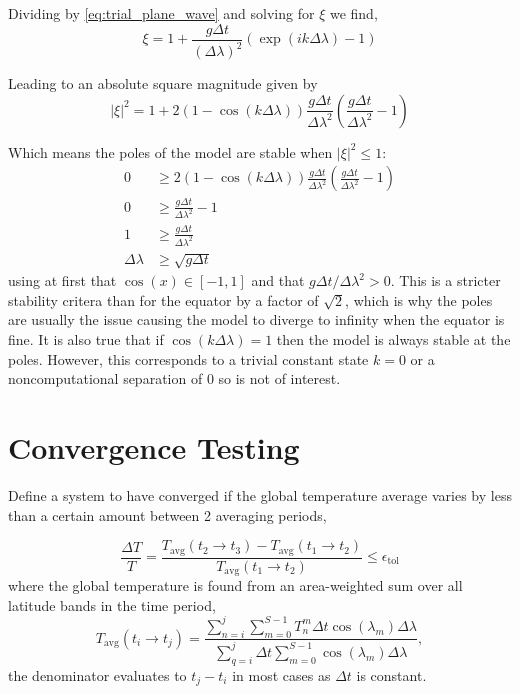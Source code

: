 \documentclass[12pt, onecolumn]{revtex4-2}    %
\begin{document}
Dividing by \eqref{eq:trial_plane_wave} and solving for $\xi$ we find,
\begin{equation}
    \xi = 1 + \frac{g\Delta t}{(\Delta \lambda)^2}\left(\exp(i k \Delta \lambda) - 1\right)
\end{equation}

Leading to an absolute square magnitude given by
\begin{equation}
    |\xi|^2 = 1 + 2 (1-\cos(k\Delta\lambda)) \frac{g \Delta t}{\Delta \lambda ^2}\left(\frac{g\Delta t}{\Delta \lambda ^2} - 1\right)
\end{equation}

Which means the poles of the model are stable when $|\xi|^2 \le 1$:
\begin{align*}
    0              & \ge 2(1-\cos(k\Delta\lambda)) \frac{g \Delta t}{\Delta \lambda ^2}\left(\frac{g\Delta t }{\Delta \lambda ^2} - 1\right) \\
    0              & \ge \frac{g \Delta t}{\Delta \lambda ^2} - 1                                                                            \\
    1              & \ge \frac{g \Delta t}{\Delta \lambda ^2}                                                                                \\
    \Delta \lambda & \ge \sqrt{g \Delta t}
\end{align*}
using at first that $\cos(x) \in [-1, 1]$ and that $g \Delta t / \Delta\lambda^2 > 0$.
This is a stricter stability critera than for the equator by a factor of $\sqrt{2}$, which is why the poles are usually the issue causing the model to diverge to infinity when the equator is fine.
It is also true that if $\cos(k\Delta\lambda) = 1$ then the model is always stable at the poles.
However, this corresponds to a trivial constant state $k = 0$ or a noncomputational separation of $0$ so is not of interest.

\section{Convergence Testing} \label{sec:conv_testing}

Define a system to have converged if the global temperature average varies by less than a certain amount between 2 averaging periods,

\begin{equation*}
    \frac{\Delta T}{T} = \frac{T_{\text{avg}}(t_2 \to t_3) - T_{\text{avg}}(t_1 \to t_2)}{T_{\text{avg}}(t_1 \to t_2)}
    \le \epsilon_{\text{tol}}
\end{equation*}
where the global temperature is found from an area-weighted sum over all latitude bands in the time period,
\begin{equation}
    T_{\text{avg}}(t_i \to t_j) = \frac{\sum_{n = i}^{j} \sum_{m = 0}^{S-1} T^m_n \Delta t \cos(\lambda_m)\Delta \lambda}{\sum_{q = i}^{j} \Delta t \sum_{m=0}^{S-1} \cos(\lambda_m)\Delta \lambda},
\end{equation}
the denominator evaluates to $t_j - t_i$ in most cases as $\Delta t$ is constant.
\end{document}
